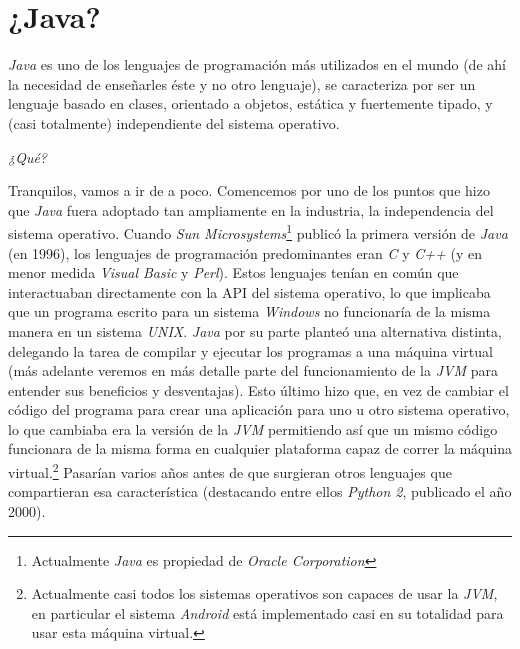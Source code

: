 \section{¿Java?}
  \textit{Java} es uno de los lenguajes de programación más utilizados en el mundo (de ahí la 
  necesidad de enseñarles éste y no otro lenguaje), se caracteriza por ser un lenguaje basado en 
  clases, orientado a objetos, estática y fuertemente tipado, y (casi totalmente) independiente del sistema 
  operativo.
  
  \begin{center}
    \textit{¿Qué?}
  \end{center}

  Tranquilos, vamos a ir de a poco.
  Comencemos por uno de los puntos que hizo que \textit{Java} fuera adoptado tan ampliamente en la
  industria, la independencia del sistema operativo.
  Cuando \textit{Sun Microsystems}\footnote{Actualmente \textit{Java} es propiedad de 
  \textit{Oracle Corporation}} publicó la primera versión de \textit{Java} (en 1996), los 
  lenguajes de programación predominantes eran \textit{C} y \textit{C++} (y en menor medida 
  \textit{Visual Basic} y \textit{Perl}).
  Estos lenguajes tenían en común que interactuaban directamente con la API del sistema operativo,
  lo que implicaba que un programa escrito para un sistema \textit{Windows} no funcionaría de la
  misma manera en un sistema \textit{UNIX}.
  \textit{Java} por su parte planteó una alternativa distinta, delegando la tarea de compilar y 
  ejecutar los programas a una máquina virtual (más adelante veremos en más detalle parte del 
  funcionamiento de la \textit{JVM} para entender sus beneficios y desventajas).
  Esto último hizo que, en vez de cambiar el código del programa para crear una aplicación para 
  uno u otro sistema operativo, lo que cambiaba era la versión de la \textit{JVM} permitiendo así
  que un mismo código funcionara de la misma forma en cualquier plataforma capaz de correr la 
  máquina virtual.\footnote{Actualmente casi todos los sistemas operativos son capaces de usar la 
  \textit{JVM}, en particular el sistema \textit{Android} está implementado casi en su totalidad 
  para usar esta máquina virtual.}
  Pasarían varios años antes de que surgieran otros lenguajes que compartieran esa característica
  (destacando entre ellos \textit{Python 2}, publicado el año 2000).



